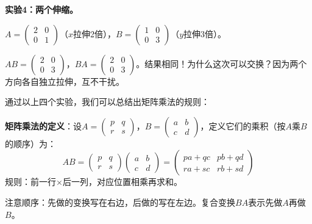 \textbf{实验4：两个伸缩。}

$A=\begin{pmatrix}2&0\\0&1\end{pmatrix}$（$x$拉伸2倍），$B=\begin{pmatrix}1&0\\0&3\end{pmatrix}$（$y$拉伸3倍）。

$AB=\begin{pmatrix}2&0\\0&3\end{pmatrix}$，$BA=\begin{pmatrix}2&0\\0&3\end{pmatrix}$。结果相同！为什么这次可以交换？因为两个方向各自独立拉伸，互不干扰。

通过以上四个实验，我们可以总结出矩阵乘法的规则：

\textbf{矩阵乘法的定义}：设$A=\begin{pmatrix}p&q\\r&s\end{pmatrix}$，$B=\begin{pmatrix}a&b\\c&d\end{pmatrix}$，定义它们的乘积（按$A$乘$B$的顺序）为：
\[
AB = \begin{pmatrix}p&q\\r&s\end{pmatrix}
\begin{pmatrix}a&b\\c&d\end{pmatrix}
= \begin{pmatrix}
pa+qc & pb+qd\\
ra+sc & rb+sd
\end{pmatrix}
\]
规则：前一行$\times$后一列，对应位置相乘再求和。

注意顺序：先做的变换写在右边，后做的写在左边。复合变换$BA$表示先做$A$再做$B$。

